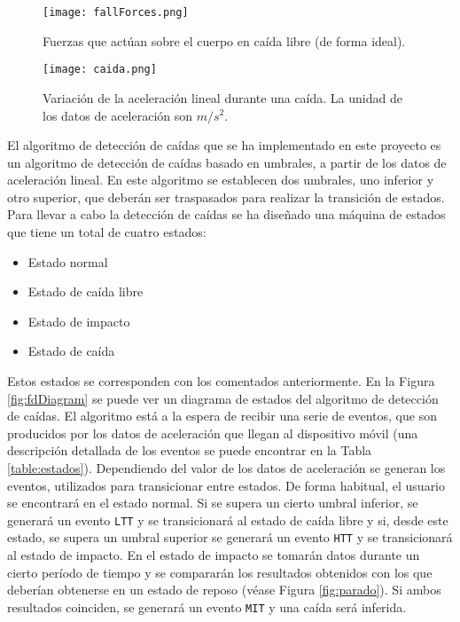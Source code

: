 \begin{figure}[!h]
\begin{center}
\texttt{[image: fallForces.png]}
\caption{Fuerzas que actúan sobre el cuerpo en caída libre (de forma ideal).}
\label{fig:fallForces}
\end{center}
\end{figure}

\begin{figure}[!h]
\begin{center}
\texttt{[image: caida.png]}
\caption{Variación de la aceleración lineal durante una caída. La unidad de los datos de aceleración son $m/s^2$.}
\label{fig:caida}
\end{center}
\end{figure}

El algoritmo de detección de caídas que se ha implementado en este proyecto es un algoritmo de detección de caídas basado en umbrales, a partir de los datos de aceleración lineal. En este algoritmo se establecen dos umbrales, uno inferior y otro superior, que deberán ser traspasados para realizar la transición de estados. Para llevar a cabo la detección de caídas se ha diseñado una máquina de estados que tiene un total de cuatro estados:

\begin{multicols}{2}
\begin{itemize}
\item Estado normal
\item Estado de caída libre
\item Estado de impacto
\item Estado de caída
\end{itemize}
\end{multicols}

Estos estados se corresponden con los comentados anteriormente. En la Figura \ref{fig:fdDiagram} se puede ver un diagrama de estados del algoritmo de detección de caídas. El algoritmo está a la espera de recibir una serie de eventos, que son producidos por los datos de aceleración que llegan al dispositivo móvil (una descripción detallada de los eventos se puede encontrar en la Tabla \ref{table:estados}). Dependiendo del valor de los datos de aceleración se generan los eventos, utilizados para transicionar entre estados. De forma habitual, el usuario se encontrará en el estado normal. Si se supera un cierto umbral inferior, se generará un evento \texttt{LTT} y se transicionará al estado de caída libre y si, desde este estado, se supera un umbral superior se generará un evento \texttt{HTT} y se transicionará al estado de impacto. En el estado de impacto se tomarán datos durante un cierto período de tiempo y se compararán los resultados obtenidos con los que deberían obtenerse en un estado de reposo (véase Figura \ref{fig:parado}). Si ambos resultados coinciden, se generará un evento \texttt{MIT} y una caída será inferida.

